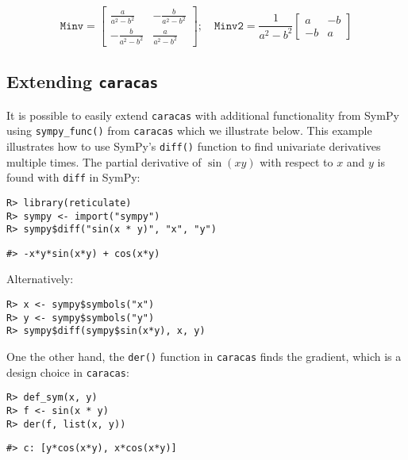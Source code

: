 \begin{equation}
\texttt{Minv} = \left[\begin{matrix}\frac{a}{a^{2} - b^{2}} & - \frac{b}{a^{2} - b^{2}}\\- \frac{b}{a^{2} - b^{2}} & \frac{a}{a^{2} - b^{2}}\end{matrix}\right]; \quad 
\texttt{Minv2} = \frac{1}{a^{2} - b^{2}}  \left[\begin{matrix}a & - b\\- b & a\end{matrix}\right]
\end{equation}

\hypertarget{extending-caracas}{%
\subsection{\texorpdfstring{Extending \texttt{caracas}}{Extending caracas}}\label{extending-caracas}}

It is possible to easily extend \texttt{caracas} with additional
functionality from SymPy using \texttt{sympy\_func()} from \texttt{caracas}
which we illustrate below. This example
illustrates how to use SymPy's \texttt{diff()} function to find univariate
derivatives multiple times. The partial derivative of \(\sin(xy)\)
with respect to \(x\) and \(y\) is found with \texttt{diff} in SymPy:

\begin{verbatim}
R> library(reticulate)
R> sympy <- import("sympy")
R> sympy$diff("sin(x * y)", "x", "y") 
\end{verbatim}

\begin{verbatim}
#> -x*y*sin(x*y) + cos(x*y)
\end{verbatim}

Alternatively:

\begin{verbatim}
R> x <- sympy$symbols("x")
R> y <- sympy$symbols("y")
R> sympy$diff(sympy$sin(x*y), x, y)
\end{verbatim}

One the other hand, the \texttt{der()} function in \texttt{caracas} finds the
gradient, which is a design choice in \texttt{caracas}:

\begin{verbatim}
R> def_sym(x, y)
R> f <- sin(x * y) 
R> der(f, list(x, y))
\end{verbatim}

\begin{verbatim}
#> c: [y*cos(x*y), x*cos(x*y)]
\end{verbatim}

